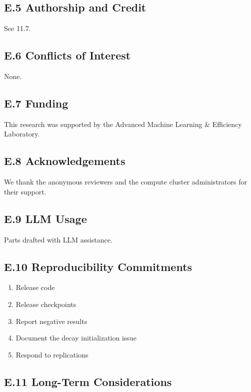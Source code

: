 \subsection{E.5 Authorship and Credit}

See  11.7.

\subsection{E.6 Conflicts of Interest}

None.

\subsection{E.7 Funding}

This research was supported by the Advanced Machine Learning \& Efficiency Laboratory.

\subsection{E.8 Acknowledgements}

We thank the anonymous reviewers and the compute cluster administrators for their support.

\subsection{E.9 LLM Usage}

Parts drafted with LLM assistance.

\subsection{E.10 Reproducibility Commitments}

\begin{enumerate}
\item Release code
\item Release checkpoints
\item Report negative results
\item Document the decay initialization issue
\item Respond to replications

\end{enumerate}
\subsection{E.11 Long-Term Considerations}

